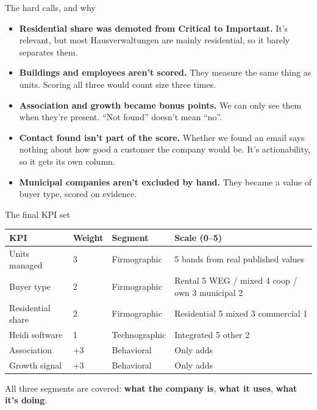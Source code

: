 \documentclass[aspectratio=169,11pt]{beamer}
\begin{document}
\begin{frame}{The hard calls, and why}
  \begin{itemize}
    \item \textbf{Residential share was demoted from Critical to Important.} It's relevant, but
          most Hausverwaltungen are mainly residential, so it barely separates them.
    \item \textbf{Buildings and employees aren't scored.} They measure the same thing as
          units. Scoring all three would count size three times.
    \item \textbf{Association and growth became bonus points.} We can only see them when
          they're present. ``Not found'' doesn't mean ``no''.
    \item \textbf{Contact found isn't part of the score.} Whether we found an email says
          nothing about how good a customer the company would be. It's actionability, so it
          gets its own column.
    \item \textbf{Municipal companies aren't excluded by hand.} They became a value of buyer
          type, scored on evidence.
  \end{itemize}
\end{frame}

\begin{frame}{The final KPI set}
  \small
  \begin{tabular}{@{}p{3.3cm} p{2.0cm} p{2.6cm} p{5.0cm}@{}}
    \toprule
    \textbf{KPI} & \textbf{Weight} & \textbf{Segment} & \textbf{Scale (0--5)} \\
    \midrule
    Units managed & 3 & Firmographic & 5 bands from real published values \\
    Buyer type & 2 & Firmographic & Rental 5 \textbullet{} WEG / mixed 4 \textbullet{}
      coop / own 3 \textbullet{} municipal 2 \\
    Residential share & 2 & Firmographic & Residential 5 \textbullet{} mixed 3
      \textbullet{} commercial 1 \\
    Heidi software & 1 & Technographic & Integrated 5 \textbullet{} other 2 \\
    Association & +3 & Behavioral & Only adds \\
    Growth signal & +3 & Behavioral & Only adds \\
    \bottomrule
  \end{tabular}
  \vspace{0.6em}

  All three segments are covered: \textbf{what the company is}, \textbf{what it uses},
  \textbf{what it's doing}.
\end{frame}
\end{document}
